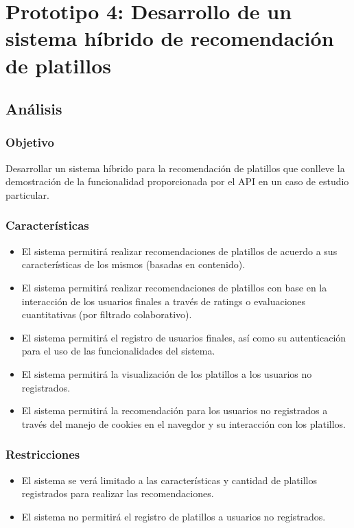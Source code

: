 \chapter{Prototipo 4: Desarrollo de un sistema híbrido de recomendación de platillos}
  \section{Análisis}
    \subsection{Objetivo}
      Desarrollar un sistema híbrido para la recomendación de platillos que conlleve la demostración de la funcionalidad proporcionada por el API en un caso de estudio particular.

    \subsection{Características}
    \begin{itemize}
      \item El sistema permitirá realizar recomendaciones de platillos de acuerdo a sus características de los mismos (basadas en contenido).
      \item El sistema permitirá realizar recomendaciones de platillos con base en la interacción de los usuarios finales a través de ratings o evaluaciones cuantitativas (por filtrado colaborativo).
      \item El sistema permitirá el registro de usuarios finales, así como su autenticación para el uso de las funcionalidades del sistema.
      \item El sistema permitirá la visualización de los platillos a los usuarios no registrados.
      \item El sistema permitirá la recomendación para los usuarios no registrados a través del manejo de cookies en el navegdor y su interacción con los platillos.
    \end{itemize}

    \subsection{Restricciones}
    \begin{itemize}
      \item El sistema se verá limitado a las características y cantidad de platillos registrados para realizar las recomendaciones.
      \item El sistema no permitirá el registro de platillos a usuarios no registrados.
    \end{itemize}


